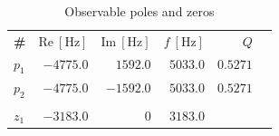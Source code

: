 \begin{table}[h]
\centering
\begin{tabular}[c]{lrrrrr}
\textbf{\#} & \textbf{$\mathrm{Re}\ [\mathrm{Hz}]$} & \textbf{$\mathrm{Im}\ [\mathrm{Hz}]$} & \textbf{$f\ [\mathrm{Hz}]$} & \textbf{$Q$} \\ 
\rowcolor{myyellow}
$p_{1}$ &$-4775.0$ &$1592.0$ &$5033.0$ &$0.5271$ \\ 
$p_{2}$ &$-4775.0$ &$-1592.0$ &$5033.0$ &$0.5271$ \\ 
\rowcolor{myyellow}
\small{ } \\ 
$z_{1}$ &$-3183.0$ &$0$ &$3183.0$ \\ 
\end{tabular}
\caption{Observable poles and  zeros}
\end{table}

